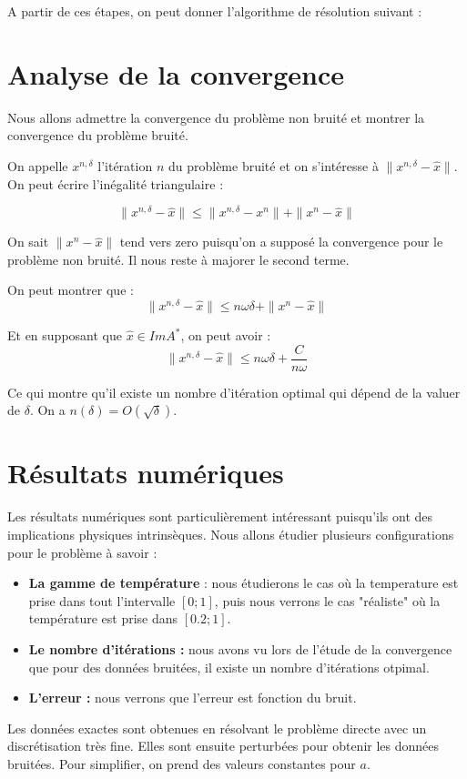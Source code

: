 \documentclass[a4paper,10pt]{article}
\begin{document}
A partir de ces étapes, on peut donner l'algorithme de résolution suivant :

\section{Analyse de la convergence}
Nous allons admettre la convergence du problème non bruité et montrer la	 convergence du problème bruité.

On appelle $x^{n, \delta}$ l'itération $n$ du problème bruité et on s'intéresse à $\|x^{n,\delta} - \hat{x} \|$. On peut écrire l'inégalité triangulaire :

\[
\|x^{n,\delta} - \hat{x} \| \leq \|x^{n,\delta} - x^n \| + \|x^n - \hat{x} \|
\]

On sait $\|x^n - \hat{x} \|$ tend vers zero puisqu'on a supposé la convergence pour le problème non bruité. Il nous reste à majorer le second terme.

On peut montrer que :
\[
\|x^{n,\delta} - \hat{x} \| \leq n\omega \delta + \|x^n - \hat{x} \|
\]

Et en supposant que $\hat{x} \in ImA^*$, on peut avoir :
\[
\|x^{n,\delta} - \hat{x} \| \leq n\omega \delta + \frac{C}{n \omega}
\]

Ce qui montre qu'il existe un nombre d'itération optimal qui dépend de la valuer de $\delta$. On a $n(\delta)=O(\sqrt{\delta})$.


\section{Résultats numériques}

Les résultats numériques sont particulièrement intéressant puisqu'ils ont des implications physiques intrinsèques. Nous allons étudier plusieurs configurations pour le problème à savoir :
\begin{itemize}
\item \textbf{La gamme de température} : nous étudierons le cas où la temperature est prise dans tout l'intervalle $[0;1]$, puis nous verrons le cas "réaliste" où la température est prise dans $[0.2;1]$.
\item \textbf{Le nombre d'itérations :} nous avons vu lors de l'étude de la convergence que pour des données bruitées, il existe un nombre d'itérations otpimal.
\item \textbf{L'erreur :} nous verrons que l'erreur est fonction du bruit.
\end{itemize}

Les données exactes sont obtenues en résolvant le problème directe avec un discrétisation très fine. Elles sont ensuite perturbées pour obtenir les données bruitées. Pour simplifier, on prend des valeurs constantes pour $a$.
\end{document}
